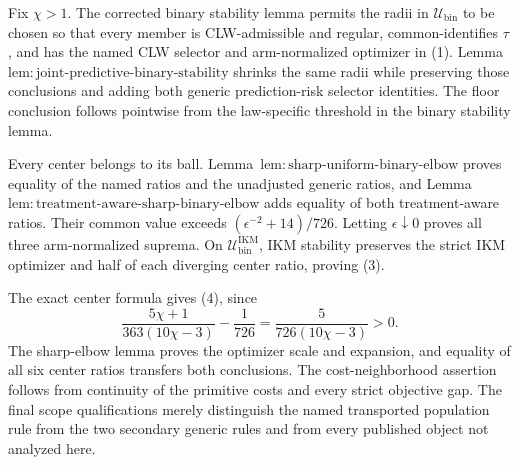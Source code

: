 Fix \(\chi>1\). The corrected binary stability lemma permits the radii in \(\mathcal U_{\mathrm{bin}}\) to be chosen so that every member is CLW-admissible and regular, common-identifies \(\tau\), and has the named CLW selector and arm-normalized optimizer in (1). Lemma~\(\mathrm{lem{:}joint\text{-}predictive\text{-}binary\text{-}stability}\) shrinks the same radii while preserving those conclusions and adding both generic prediction-risk selector identities. The floor conclusion follows pointwise from the law-specific threshold in the binary stability lemma.

Every center belongs to its ball. Lemma~\(\mathrm{lem{:}sharp\text{-}uniform\text{-}binary\text{-}elbow}\) proves equality of the named ratios and the unadjusted generic ratios, and Lemma~\(\mathrm{lem{:}treatment\text{-}aware\text{-}sharp\text{-}binary\text{-}elbow}\) adds equality of both treatment-aware ratios. Their common value exceeds \((\epsilon^{-2}+14)/726\). Letting \(\epsilon\downarrow0\) proves all three arm-normalized suprema. On \(\mathcal U_{\mathrm{bin}}^{\mathrm{IKM}}\), IKM stability preserves the strict IKM optimizer and half of each diverging center ratio, proving (3).

The exact center formula gives (4), since
\[
 \frac{5\chi+1}{363(10\chi-3)}-\frac1{726}
 =\frac5{726(10\chi-3)}>0.
\]
The sharp-elbow lemma proves the optimizer scale and expansion, and equality of all six center ratios transfers both conclusions. The cost-neighborhood assertion follows from continuity of the primitive costs and every strict objective gap. The final scope qualifications merely distinguish the named transported population rule from the two secondary generic rules and from every published object not analyzed here.